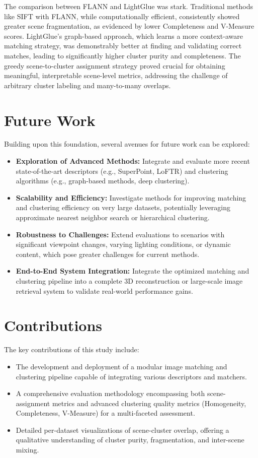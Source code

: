 \documentclass[report.tex]{subfiles}
\begin{document}
The comparison between FLANN and LightGlue was stark. Traditional methods like SIFT with FLANN, while computationally efficient, consistently showed greater scene fragmentation, as evidenced by lower Completeness and V-Measure scores. LightGlue's graph-based approach, which learns a more context-aware matching strategy, was demonstrably better at finding and validating correct matches, leading to significantly higher cluster purity and completeness. The greedy scene-to-cluster assignment strategy proved crucial for obtaining meaningful, interpretable scene-level metrics, addressing the challenge of arbitrary cluster labeling and many-to-many overlaps.

\section{Future Work}
Building upon this foundation, several avenues for future work can be explored:
\begin{itemize}
    \item \textbf{Exploration of Advanced Methods:} Integrate and evaluate more recent state-of-the-art descriptors (e.g., SuperPoint, LoFTR) and clustering algorithms (e.g., graph-based methods, deep clustering).
    \item \textbf{Scalability and Efficiency:} Investigate methods for improving matching and clustering efficiency on very large datasets, potentially leveraging approximate nearest neighbor search or hierarchical clustering.
    \item \textbf{Robustness to Challenges:} Extend evaluations to scenarios with significant viewpoint changes, varying lighting conditions, or dynamic content, which pose greater challenges for current methods.
    \item \textbf{End-to-End System Integration:} Integrate the optimized matching and clustering pipeline into a complete 3D reconstruction or large-scale image retrieval system to validate real-world performance gains.
\end{itemize}

\section{Contributions}
The key contributions of this study include:
\begin{itemize}
    \item The development and deployment of a modular image matching and clustering pipeline capable of integrating various descriptors and matchers.
    \item A comprehensive evaluation methodology encompassing both scene-assignment metrics and advanced clustering quality metrics (Homogeneity, Completeness, V-Measure) for a multi-faceted assessment.
    \item Detailed per-dataset visualizations of scene-cluster overlap, offering a qualitative understanding of cluster purity, fragmentation, and inter-scene mixing.
\end{itemize}
\end{document}
